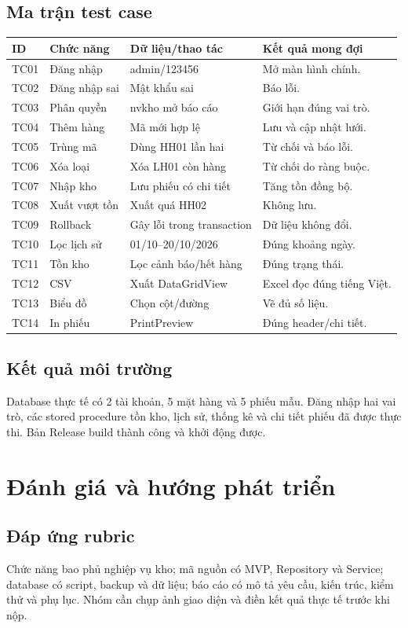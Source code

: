 \documentclass[12pt,a4paper]{report}
\begin{document}
\section{Ma trận test case}
\begin{longtable}{p{}p{}p{}p{}}
\toprule ID & Chức năng & Dữ liệu/thao tác & Kết quả mong đợi\\\midrule
TC01 & Đăng nhập & admin/123456 & Mở màn hình chính.\\
TC02 & Đăng nhập sai & Mật khẩu sai & Báo lỗi.\\
TC03 & Phân quyền & nvkho mở báo cáo & Giới hạn đúng vai trò.\\
TC04 & Thêm hàng & Mã mới hợp lệ & Lưu và cập nhật lưới.\\
TC05 & Trùng mã & Dùng HH01 lần hai & Từ chối và báo lỗi.\\
TC06 & Xóa loại & Xóa LH01 còn hàng & Từ chối do ràng buộc.\\
TC07 & Nhập kho & Lưu phiếu có chi tiết & Tăng tồn đồng bộ.\\
TC08 & Xuất vượt tồn & Xuất quá HH02 & Không lưu.\\
TC09 & Rollback & Gây lỗi trong transaction & Dữ liệu không đổi.\\
TC10 & Lọc lịch sử & 01/10--20/10/2026 & Đúng khoảng ngày.\\
TC11 & Tồn kho & Lọc cảnh báo/hết hàng & Đúng trạng thái.\\
TC12 & CSV & Xuất DataGridView & Excel đọc đúng tiếng Việt.\\
TC13 & Biểu đồ & Chọn cột/đường & Vẽ đủ số liệu.\\
TC14 & In phiếu & PrintPreview & Đúng header/chi tiết.\\
\bottomrule
\end{longtable}
\section{Kết quả môi trường}
Database thực tế có 2 tài khoản, 5 mặt hàng và 5 phiếu mẫu. Đăng nhập hai vai trò,
các stored procedure tồn kho, lịch sử, thống kê và chi tiết phiếu đã được thực thi.
Bản Release build thành công và khởi động được.

\chapter{Đánh giá và hướng phát triển}
\section{Đáp ứng rubric}
Chức năng bao phủ nghiệp vụ kho; mã nguồn có MVP, Repository và Service; database
có script, backup và dữ liệu; báo cáo có mô tả yêu cầu, kiến trúc, kiểm thử và
phụ lục. Nhóm cần chụp ảnh giao diện và điền kết quả thực tế trước khi nộp.
\end{document}
